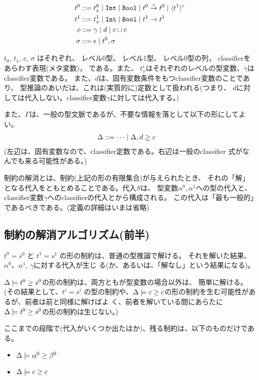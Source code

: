 \documentclass[dvipdfmx]{jsarticle}
\newcommand\longer[2]{{#1} \ord {#2}}
\newcommand\Int{\mbox{\texttt{Int}}}
\newcommand\Bool{\mbox{\texttt{Bool}}}
\newcommand\uni{\cup} %
\begin{document}
\begin{align*}
  t^0      & ::= t^0_x \mid \Int \mid \Bool \mid \funT{t^0}{t^0}{c} \mid \codeT{t^1}{c} \\
  t^1      & ::= t^1_x \mid \Int \mid \Bool \mid \funT{t^1}{t^1}{} \\
  c        & ::= \gamma \mid d \mid c \uni c \\
  \sigma   & ::= \epsilon \mid t^0, \sigma
\end{align*}


$t_0$, $t_1$, $c$, $\sigma$ はそれぞれ、
レベル0型、
レベル1型、
レベル0型の列，
classifierをあらわす表現(メタ変数)，
である。また、
$t^i_x$はそれぞれのレベルの型変数、$\gamma$はclassifier変数である。
また、$d$は、固有変数条件をもつclassifier変数のことであり、
型推論のあいだは、これは(実質的に)定数として扱われる(つまり、
$d$に対しては代入しない。classifier変数$\gamma$に対しては代入する。)

また、$\Gamma$は、一般の型文脈であるが、不要な情報を落として以下の形にしてよい。
\begin{align*}
  \Delta & ::= \cdots \mid \Delta,\longer{d}{c}
\end{align*}
(左辺は、固有変数なので、classifier定数である。右辺は一般のclassifier
式がなんでも来る可能性がある。)

制約の解消とは、制約(上記の形の有限集合)が与えられたとき、
それの「解」となる代入をともとめることである。代入$S$は、
型変数$\alpha^0, \alpha^1$への型の代入と、
classifier変数$\gamma$へのclassifierの代入とから構成される。
この代入は「最も一般的」であるべきである。(定義の詳細はいまは省略)

\subsection{制約の解消アルゴリズム(前半)}

$t^0=s^0$ と $t^1=s^1$ の形の制約は、普通の型推論で解ける。
それを解いた結果、$\alpha^0$、$\alpha^1$, $\gamma$に対する代入が生じ
る(か、あるいは、「解なし」という結果になる)。

$\Delta \models \longer{t^0}{s^0}$の形の制約は、両方ともが型変数の場合以外は、
簡単に解ける。(その結果として、$t^i=s^i$ の型の制約や、$\Delta \models
\longer{c}{c}$の形の制約を生む可能性があるが、前者は前と同様に解けばよ
く、前者を解いている間にあらたに$\Delta \models \longer{t^0}{s^0}$の形の制約は生じない。)

ここまでの段階で(代入がいくつか出たほか)、残る制約は、以下のものだけである。

\begin{itemize}
\item $\Delta \models \longer{\alpha^0}{\beta^0}$
\item $\Delta \models \longer{c}{c}$
\end{itemize}
\end{document}
